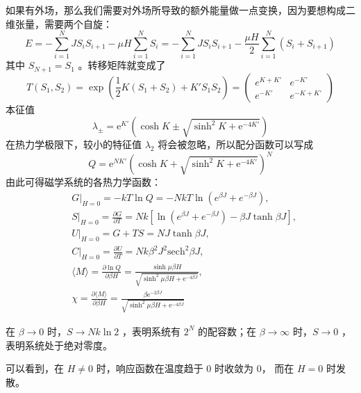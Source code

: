 如果有外场，那么我们需要对外场所导致的额外能量做一点变换，因为要想构成二维张量，需要两个自旋：
\[
    E = -\sum_{i=1}^N JS_i S_{i+1} - \mu H\sum_{i=1}^N S_i = -\sum_{i=1}^N JS_i S_{i+1} - \frac{\mu H}{2} \sum_{i=1}^N (S_i + S_{i+1})
\]
其中 $S_{N+1} = S_1$ 。转移矩阵就变成了
\begin{equation}
    T(S_1,S_2) = \exp(\frac{1}{2}K (S_1+S_2) + K' S_1 S_{2}) = \begin{pmatrix}
        e^{K+K'} & e^{-K'} \\
        e^{-K'} & e^{-K+K'}
    \end{pmatrix} 
\end{equation}
本征值
\begin{equation}
    \lambda_\pm = \mathrm{e}^{ K'}\left(\cosh K \pm \sqrt{\sinh ^2 K + \mathrm{e}^{-4 K'}}\right)
\end{equation}
在热力学极限下，较小的特征值 $\lambda_2$ 将会被忽略，所以配分函数可以写成
\begin{equation}
    Q=\mathrm{e}^{N K'}\left(\cosh K+\sqrt{\sinh ^2 K+\mathrm{e}^{-4 K'}}\right)^N
\end{equation}
由此可得磁学系统的各热力学函数：
\begin{align*}
    &G\bigg|_{H=0} = -kT\ln Q = -NkT \ln (e^{\beta J} + e^{-\beta J}), \\
    &S\bigg|_{H=0} = \frac{\partial G}{\partial T} = Nk\left[\ln (e^{\beta J} + e^{-\beta J}) - \beta J \tanh\beta J\right],\\
    &U\bigg|_{H=0} = G + TS =  NJ \tanh\beta J,\\
    &C\bigg|_{H=0} = \frac{\partial U}{\partial T} = Nk\beta^2 J^2 \mathrm{sech}^2 \beta J,\\
    &\langle M \rangle = \frac{\partial \ln Q}{\partial \beta H} = \frac{\sinh \mu \beta H}{\sqrt{\sinh ^2 \mu \beta H+\mathrm{e}^{-4 \beta J}}},\\
    &\chi = \frac{\partial \langle M \rangle}{\partial \beta H} = \frac{\beta \mathrm{e}^{-2 \beta J}}{\sqrt{\sinh ^2 \mu \beta H+\mathrm{e}^{-4 \beta J}}}
\end{align*}

在 $\beta \rightarrow 0$ 时，$S \rightarrow Nk\ln 2$ ，表明系统有 $2^N$ 的配容数；在 $\beta \rightarrow \infty$ 时，$S \rightarrow 0$ ，表明系统处于绝对零度。
 
可以看到，在 $H \neq 0$ 时，响应函数在温度趋于 $0$ 时收敛为 $0$， 而在 $H = 0$ 时发散。

